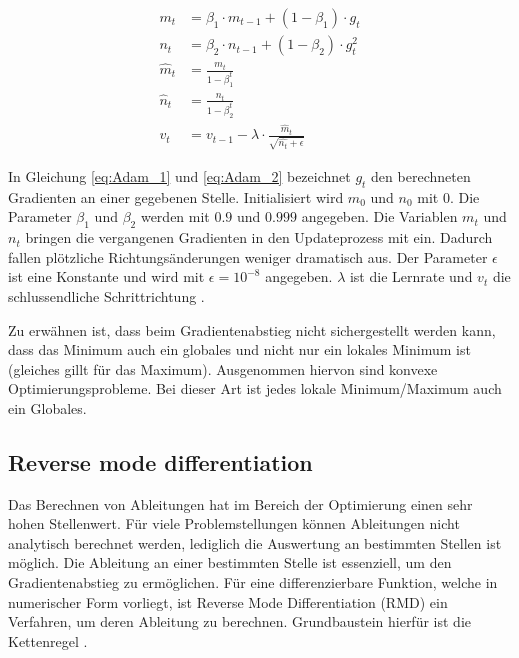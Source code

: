 \begin{subequations}
  \begin{align}
m_t &= \beta_1 \cdot m_{t-1} + (1-\beta_1) \cdot g_t \label{eq:Adam_1} \\
n_t &= \beta_2 \cdot n_{t-1} + (1-\beta_2) \cdot g_t^2 \label{eq:Adam_2} \\
\hat{m}_t &= \frac{m_t}{1-\beta_1^t}  \label{eq:Adam_3} \\
\hat{n}_t &= \frac{n_t}{1-\beta_2^t} \label{eq:Adam_4} \\
v_t &= v_{t-1} - \lambda \cdot \frac{\hat{m}_t}{\sqrt{\hat{n_t}+\epsilon}} \label{eq:Adam_5}
\end{align}
\end{subequations}

In Gleichung \ref{eq:Adam_1} und \ref{eq:Adam_2} bezeichnet $g_t$ den berechneten Gradienten an einer gegebenen Stelle. Initialisiert wird $m_0$ und $n_0$ mit $0$. Die Parameter $\beta_1$ und $\beta_2$ werden mit $0.9$ und $0.999$ angegeben. Die Variablen $m_t$ und $n_t$ bringen die vergangenen Gradienten in den Updateprozess mit ein.
Dadurch fallen plötzliche Richtungsänderungen weniger dramatisch aus.
Der Parameter $\epsilon$ ist eine Konstante und wird mit $\epsilon = 10^{-8}$ angegeben.
$\lambda$ ist die Lernrate und $v_t$ die schlussendliche Schrittrichtung \citet{Adam}.



  Zu erwähnen ist, dass beim Gradientenabstieg nicht sichergestellt werden kann, dass das Minimum auch ein globales und nicht nur ein lokales Minimum ist (gleiches gillt für das Maximum).
Ausgenommen hiervon sind konvexe Optimierungsprobleme. Bei dieser Art ist jedes lokale Minimum/Maximum auch ein Globales.

\subsection{Reverse mode differentiation}\label{sec:RMD}

Das Berechnen von Ableitungen hat im Bereich der Optimierung einen sehr hohen Stellenwert.
Für viele Problemstellungen können Ableitungen nicht analytisch berechnet werden, lediglich die Auswertung an bestimmten Stellen ist möglich. Die Ableitung an einer bestimmten Stelle ist essenziell, um den Gradientenabstieg zu ermöglichen.
Für eine differenzierbare Funktion, welche in numerischer Form vorliegt, ist Reverse Mode Differentiation (RMD) ein Verfahren, um deren Ableitung zu berechnen. Grundbaustein hierfür ist die Kettenregel \cite{DBLP:journals/corr/abs-1811-05031}.

